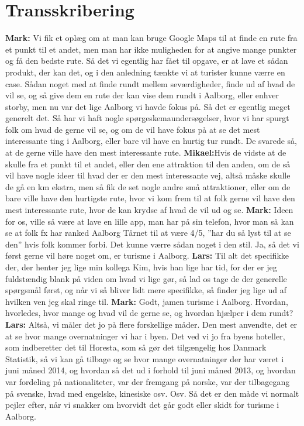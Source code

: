 \section{Transskribering}
\textbf{Mark:} Vi fik et oplæg om at man kan bruge Google Maps til at finde en rute fra et punkt til et andet, men man har ikke muligheden for at angive mange punkter og få den bedste rute. Så det vi egentlig har fået til opgave, er at lave et sådan produkt, der kan det, og i den anledning tænkte vi at turister kunne værre en case. Sådan noget med at finde rundt mellem seværdigheder, finde ud af hvad de vil se, og så give dem en rute der kan vise dem rundt i Aalborg, eller enhver storby, men nu var det lige Aalborg vi havde fokus på. Så det er egentlig meget generelt det. Så har vi haft nogle spørgeskemaundersøgelser, hvor vi har spurgt folk om hvad de gerne vil se, og om de vil have fokus på at se det mest interessante ting i Aalborg, eller bare vil have en hurtig tur rundt. De svarede så, at de gerne ville have den mest interessante rute. \newline
\textbf{Mikael:}Hvis de vidste at de skulle fra et punkt til et andet, eller den ene attraktion til den anden, om de så vil have nogle ideer til hvad der er den mest interessante vej, altså måske skulle de gå en km ekstra, men så fik de set nogle andre små attraktioner, eller om de bare ville have den hurtigste rute, hvor vi kom frem til at folk gerne vil have den mest interessante rute, hvor de kan krydse af hvad de vil ud og se. \newline
\textbf{Mark:} Ideen for os, ville så være at lave en lille app, man har på sin telefon, hvor man så kan se at folk fx har ranked Aalborg Tårnet til at være 4/5, ”har du så lyst til at se den” hvis folk kommer forbi. Det kunne værre sådan noget i den stil. Ja, så det vi først gerne vil høre noget om, er turisme i Aalborg. \newline
\textbf{Lars:} Til alt det specifikke der, der henter jeg lige min kollega Kim, hvis han lige har tid, for der er jeg fuldstændig blank på viden om hvad vi lige gør, så lad os tage de der generelle spørgsmål først, og når vi så bliver lidt mere specifikke, så finder jeg lige ud af hvilken ven jeg skal ringe til. \newline
\textbf{Mark:} Godt, jamen turisme i Aalborg. Hvordan, hvorledes, hvor mange og hvad vil de gerne se, og hvordan hjælper i dem rundt? \newline
\textbf{Lars:} Altså, vi måler det jo på flere forskellige måder. Den mest anvendte, det er at se hvor mange overnatninger vi har i byen. Det ved vi jo fra byens hoteller, som indberetter det til Horesta, som så gør det tilgængelig hos Danmark Statistik, så vi kan gå tilbage og se hvor mange overnatninger der har været i juni måned 2014, og hvordan så det ud i forhold til juni måned 2013, og hvordan var fordeling på nationaliteter, var der fremgang på norske, var der tilbagegang på svenske, hvad med engelske, kinesiske osv. Osv. Så det er den måde vi normalt pejler efter, når vi snakker om hvorvidt det går godt eller skidt for turisme i Aalborg. \newline
